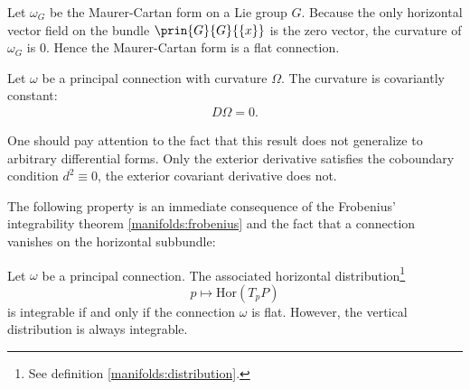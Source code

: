     \begin{example}
        Let $\omega_G$ be the Maurer-Cartan form on a Lie group $G$. Because the only horizontal vector field on the bundle $\prin{G}{G}{\{x\}}$ is the zero vector, the curvature of $\omega_G$ is 0. Hence the Maurer-Cartan form is a flat connection.
    \end{example}

    \begin{property}
        Let $\omega$ be a principal connection with curvature $\Omega$. The curvature is covariantly constant:
        \begin{gather}
            D\Omega = 0.
        \end{gather}
    \end{property}
    \begin{remark}
        One should pay attention to the fact that this result\mnote{\dbend} does not generalize to arbitrary differential forms. Only the exterior derivative satisfies the coboundary condition $d^2 \equiv 0$, the exterior covariant derivative does not.
    \end{remark}


    The following property is an immediate consequence of the Frobenius' integrability theorem \ref{manifolds:frobenius} and the fact that a connection vanishes on the horizontal subbundle:
    \begin{property}
        Let $\omega$ be a principal connection. The associated horizontal distribution\footnote{See definition \ref{manifolds:distribution}.} \[p\mapsto\text{Hor}(T_pP)\] is integrable if and only if the connection $\omega$ is flat. However, the vertical distribution is always integrable.
    \end{property}

